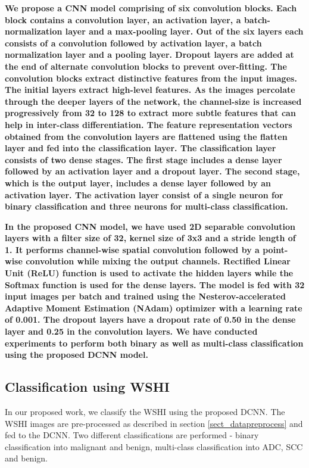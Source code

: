 \documentclass[conference]{IEEEtran}
\begin{document}
\textbf{
We propose a CNN model comprising of six convolution blocks. Each block contains a convolution layer, an activation layer, a batch-normalization layer and a max-pooling layer. Out of the six layers each consists of a convolution followed by activation layer, a batch normalization layer and a pooling layer. Dropout layers are added at the end of alternate convolution blocks to prevent over-fitting. The convolution blocks extract distinctive features from the input images. The initial layers extract high-level features. As the images percolate through the deeper layers of the network, the channel-size is increased progressively from 32 to 128 to extract more subtle features that can help in inter-class differentiation. The feature representation vectors obtained from the convolution layers are flattened using the flatten layer and fed into the classification layer. The classification layer consists of two dense stages. The first stage includes a dense layer followed by an activation layer and a dropout layer. The second stage, which is the output layer, includes a dense layer followed by an activation layer. The activation layer consist of a single neuron for binary classification and three neurons for multi-class classification.
}

\textbf{
In the proposed CNN model, we have used 2D separable convolution layers with a filter size of 32, kernel size of 3x3 and a stride length of 1. It performs channel-wise spatial convolution followed by a point- wise convolution while mixing the output channels. Rectified Linear Unit (ReLU) function is used to activate the hidden layers while the Softmax function is used for the dense layers. The model is fed with 32 input images per batch and trained using the Nesterov-accelerated Adaptive Moment Estimation (NAdam) optimizer with a learning rate of 0.001. The dropout layers have a dropout rate of 0.50 in the dense layer and 0.25 in the convolution layers. We have conducted experiments to perform both binary as well as multi-class classification using the proposed DCNN model.
}

\subsection{Classification using WSHI}

In our proposed work, we classify the WSHI using the proposed DCNN. The WSHI images are pre-processed as described in section \ref{sect_datapreprocess} and fed to the DCNN. Two different classifications are performed - binary classification into malignant and benign, multi-class classification into ADC, SCC and benign.  
\end{document}
